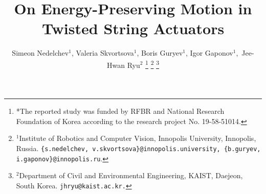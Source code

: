 \documentclass[letterpaper, 10 pt, conference]{ieeeconf}  %
\title{On Energy-Preserving Motion in Twisted String Actuators}
\author{Simeon Nedelchev$^1$, Valeria Skvortsova$^1$, Boris Guryev$^1$, Igor Gaponov$^1$,~Jee-Hwan Ryu$^2$ %
     \thanks{*The reported study was funded by RFBR and National Research Foundation of Korea according to the research project No. 19-58-51014.}
     \thanks{$^1$Institute of Robotics and Computer Vision, Innopolis University, Innopolis, Russia. {\tt\footnotesize  \{s.nedelchev, v.skvortsova\}@innopolis.university,  \{b.guryev, i.gaponov\}@innopolis.ru}.}
    \thanks{ $^2$Department of Civil and Environmental Engineering, KAIST, Daejeon, South Korea. \tt\footnotesize jhryu@kaist.ac.kr.}
 }
\begin{document}
	\maketitle 
	\thispagestyle{empty}
	\pagestyle{empty}
	\begin{abstract}
	
	\end{abstract}	
	
    
    


    \addtolength{\textheight}{-12cm}   %


	
	
\end{document}
